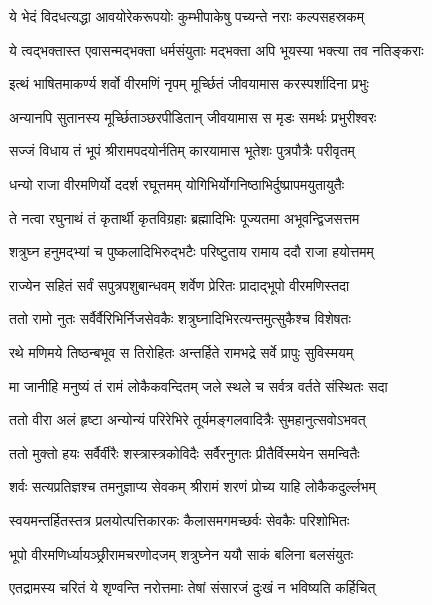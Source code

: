 \twolineshloka
{ये भेदं विदधत्यद्धा आवयोरेकरूपयोः}
{कुम्भीपाकेषु पच्यन्ते नराः कल्पसहस्रकम्}%

\twolineshloka
{ये त्वद्भक्तास्त एवासन्मद्भक्ता धर्मसंयुताः}
{मद्भक्ता अपि भूयस्या भक्त्या तव नतिङ्कराः}%


\twolineshloka
{इत्थं भाषितमाकर्ण्य शर्वो वीरमणिं नृपम्}
{मूर्च्छितं जीवयामास करस्पर्शादिना प्रभुः}%

\twolineshloka
{अन्यानपि सुतानस्य मूर्च्छिताञ्छरपीडितान्}
{जीवयामास स मृडः समर्थः प्रभुरीश्वरः}%

\twolineshloka
{सज्जं विधाय तं भूपं श्रीरामपदयोर्नतिम्}
{कारयामास भूतेशः पुत्रपौत्रैः परीवृतम्}%

\twolineshloka
{धन्यो राजा वीरमणिर्यो ददर्श रघूत्तमम्}
{योगिभिर्योगनिष्ठाभिर्दुष्प्रापमयुतायुतैः}%

\twolineshloka
{ते नत्वा रघुनाथं तं कृतार्थी कृतविग्रहाः}
{ब्रह्मादिभिः पूज्यतमा अभूवन्द्विजसत्तम}%

\twolineshloka
{शत्रुघ्न हनुमद्भ्यां च पुष्कलादिभिरुद्भटैः}
{परिष्टुताय रामाय ददौ राजा हयोत्तमम्}%

\twolineshloka
{राज्येन सहितं सर्वं सपुत्रपशुबान्धवम्}
{शर्वेण प्रेरितः प्रादाद्भूपो वीरमणिस्तदा}%

\twolineshloka
{ततो रामो नुतः सर्वैर्वैरिभिर्निजसेवकैः}
{शत्रुघ्नादिभिरत्यन्तमुत्सुकैश्च विशेषतः}%

\twolineshloka
{रथे मणिमये तिष्ठन्बभूव स तिरोहितः}
{अन्तर्हिते रामभद्रे सर्वे प्रापुः सुविस्मयम्}%

\twolineshloka
{मा जानीहि मनुष्यं तं रामं लोकैकवन्दितम्}
{जले स्थले च सर्वत्र वर्तते संस्थितः सदा}%

\twolineshloka
{ततो वीरा अलं हृष्टा अन्योन्यं परिरेभिरे}
{तूर्यमङ्गलवादित्रैः सुमहानुत्सवोऽभवत्}%

\twolineshloka
{ततो मुक्तो हयः सर्वैर्वीरैः शस्त्रास्त्रकोविदैः}
{सर्वैरनुगतः प्रीतैर्विस्मयेन समन्वितैः}%

\twolineshloka
{शर्वः सत्यप्रतिज्ञश्च तमनुज्ञाप्य सेवकम्}
{श्रीरामं शरणं प्रोच्य याहि लोकैकदुर्ल्लभम्}%

\twolineshloka
{स्वयमन्तर्हितस्तत्र प्रलयोत्पत्तिकारकः}
{कैलासमगमच्छर्वः सेवकैः परिशोभितः}%

\twolineshloka
{भूपो वीरमणिर्ध्यायञ्छ्रीरामचरणोदजम्}
{शत्रुघ्नेन ययौ साकं बलिना बलसंयुतः}%

\twolineshloka
{एतद्रामस्य चरितं ये शृण्वन्ति नरोत्तमाः}
{तेषां संसारजं दुःखं न भविष्यति कर्हिचित्}%

